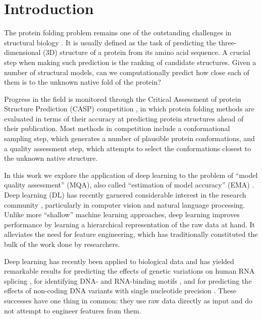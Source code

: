\documentclass{bioinfo}
\begin{document}
\section{Introduction}

The protein folding problem remains one of the outstanding challenges
in structural biology \citep{dill2012folding}.  It is usually defined
as the task of predicting the three-dimensional (3D) structure of a
protein from its amino acid sequence. A crucial step when making such
prediction is the ranking of candidate structures. Given a number of
structural models, can we computationally predict how close each of
them is to the unknown native fold of the protein?

Progress in the field is monitored through the Critical Assessment of
protein Structure Prediction (CASP) competition \citep{moult1995large},
in which protein folding methods are evaluated in terms of their
accuracy at predicting protein structures ahead of their
publication. Most methods in competition include a conformational
sampling step, which generates a number of plausible protein
conformations, and a quality assessment step, which attempts to select
the conformations closest to the unknown native structure.

In this work we explore the application of deep learning to the
problem of ``model quality assessment'' (MQA), also called
``estimation of model accuracy'' (EMA) \citep{kryshtafovych2015}. Deep
learning (DL) has recently garnered considerable interest in the
research community \citep{lecun2015deep}, particularly in computer
vision and natural language processing. Unlike more ``shallow''
machine learning approaches, deep learning improves performance by
learning a hierarchical representation of the raw data at hand. It
alleviates the need for feature engineering, which has traditionally
constituted the bulk of the work done by researchers.

Deep learning has recently been applied to biological data and has
yielded remarkable results for predicting the effects of genetic
variations on human RNA splicing \citep{xiong2015human}, for
identifying DNA- and RNA-binding
motifs \citep{alipanahi2015predicting}, and for predicting the effects
of non-coding DNA variants with single nucleotide
precision \citep{zhou2015predicting}. These successes have one thing in
common: they use raw data directly as input and do not attempt to
engineer features from them.
\end{document}

